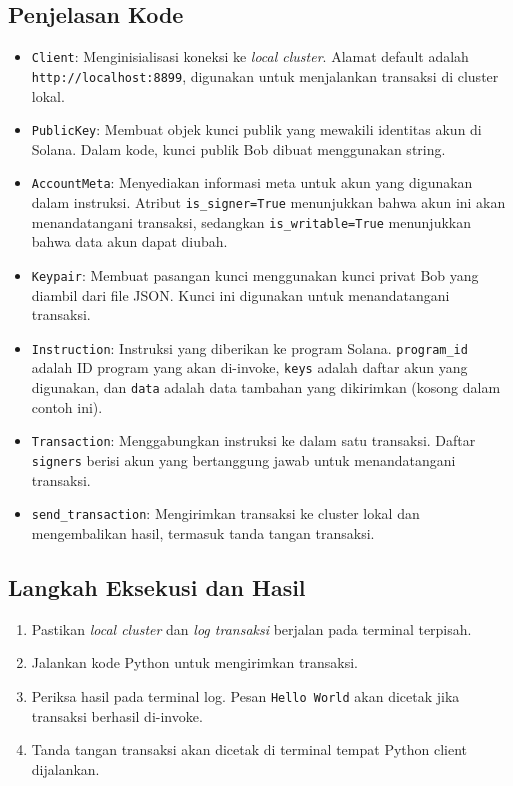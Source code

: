 \subsection{Penjelasan Kode}
\begin{itemize}
	\item \texttt{Client}: Menginisialisasi koneksi ke \textit{local cluster}. Alamat default adalah \texttt{http://localhost:8899}, digunakan untuk menjalankan transaksi di cluster lokal.
	\item \texttt{PublicKey}: Membuat objek kunci publik yang mewakili identitas akun di Solana. Dalam kode, kunci publik Bob dibuat menggunakan string.
	\item \texttt{AccountMeta}: Menyediakan informasi meta untuk akun yang digunakan dalam instruksi. Atribut \texttt{is\_signer=True} menunjukkan bahwa akun ini akan menandatangani transaksi, sedangkan \texttt{is\_writable=True} menunjukkan bahwa data akun dapat diubah.
	\item \texttt{Keypair}: Membuat pasangan kunci menggunakan kunci privat Bob yang diambil dari file JSON. Kunci ini digunakan untuk menandatangani transaksi.
	\item \texttt{Instruction}: Instruksi yang diberikan ke program Solana. \texttt{program\_id} adalah ID program yang akan di-invoke, \texttt{keys} adalah daftar akun yang digunakan, dan \texttt{data} adalah data tambahan yang dikirimkan (kosong dalam contoh ini).
	\item \texttt{Transaction}: Menggabungkan instruksi ke dalam satu transaksi. Daftar \texttt{signers} berisi akun yang bertanggung jawab untuk menandatangani transaksi.
	\item \texttt{send\_transaction}: Mengirimkan transaksi ke cluster lokal dan mengembalikan hasil, termasuk tanda tangan transaksi.
\end{itemize}

\subsection{Langkah Eksekusi dan Hasil}
\begin{enumerate}
	\item Pastikan \textit{local cluster} dan \textit{log transaksi} berjalan pada terminal terpisah.
	\item Jalankan kode Python untuk mengirimkan transaksi.
	\item Periksa hasil pada terminal log. Pesan \texttt{Hello World} akan dicetak jika transaksi berhasil di-invoke.
	\item Tanda tangan transaksi akan dicetak di terminal tempat Python client dijalankan.
\end{enumerate}

